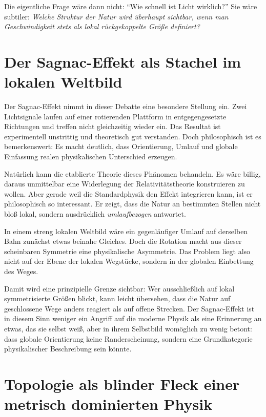 \documentclass[11pt,a4paper]{article}
\theoremstyle{remark}
\begin{document}
	Die eigentliche Frage wäre dann nicht: ``Wie schnell ist Licht wirklich?'' Sie wäre subtiler: \emph{Welche Struktur der Natur wird überhaupt sichtbar, wenn man Geschwindigkeit stets als lokal rückgekoppelte Größe definiert?}
	
	\section{Der Sagnac-Effekt als Stachel im lokalen Weltbild}
	
	Der Sagnac-Effekt nimmt in dieser Debatte eine besondere Stellung ein. Zwei Lichtsignale laufen auf einer rotierenden Plattform in entgegengesetzte Richtungen und treffen nicht gleichzeitig wieder ein. Das Resultat ist experimentell unstrittig und theoretisch gut verstanden. Doch philosophisch ist es bemerkenswert: Es macht deutlich, dass Orientierung, Umlauf und globale Einfassung realen physikalischen Unterschied erzeugen.
	
	Natürlich kann die etablierte Theorie dieses Phänomen behandeln. Es wäre billig, daraus unmittelbar eine Widerlegung der Relativitätstheorie konstruieren zu wollen. Aber gerade weil die Standardphysik den Effekt integrieren kann, ist er philosophisch so interessant. Er zeigt, dass die Natur an bestimmten Stellen nicht bloß lokal, sondern ausdrücklich \emph{umlaufbezogen} antwortet.
	
	In einem streng lokalen Weltbild wäre ein gegenläufiger Umlauf auf derselben Bahn zunächst etwas beinahe Gleiches. Doch die Rotation macht aus dieser scheinbaren Symmetrie eine physikalische Asymmetrie. Das Problem liegt also nicht auf der Ebene der lokalen Wegstücke, sondern in der globalen Einbettung des Weges.
	
	Damit wird eine prinzipielle Grenze sichtbar: Wer ausschließlich auf lokal symmetrisierte Größen blickt, kann leicht übersehen, dass die Natur auf geschlossene Wege anders reagiert als auf offene Strecken. Der Sagnac-Effekt ist in diesem Sinn weniger ein Angriff auf die moderne Physik als eine Erinnerung an etwas, das sie selbst weiß, aber in ihrem Selbstbild womöglich zu wenig betont: dass globale Orientierung keine Randerscheinung, sondern eine Grundkategorie physikalischer Beschreibung sein könnte.
	
	\section{Topologie als blinder Fleck einer metrisch dominierten Physik}
	
\end{document}
